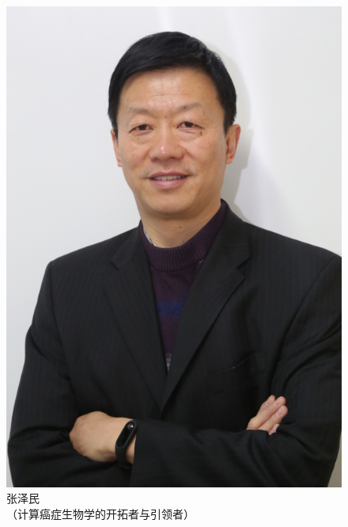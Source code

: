 \documentclass[11pt]{ctexbeamer}
\begin{document}
\begin{frame}
\begin{columns}
\begin{figure}
    \includegraphics[width=\textwidth]{people_Zhang.png}
    张泽民\\
    （计算癌症生物学的开拓者与引领者）
  \end{figure}
  \end{columns}
\end{frame}
\end{document}
